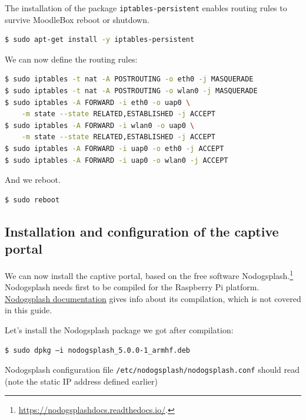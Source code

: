 \documentclass[12pt]{article}
\begin{document}
The installation of the package \lstinline{iptables-persistent} enables routing rules to survive MoodleBox reboot or shutdown.
\begin{lstlisting}[language=bash]
$ sudo apt-get install -y iptables-persistent
\end{lstlisting}

We can now define the routing rules:
\begin{lstlisting}[language=bash]
$ sudo iptables -t nat -A POSTROUTING -o eth0 -j MASQUERADE
$ sudo iptables -t nat -A POSTROUTING -o wlan0 -j MASQUERADE
$ sudo iptables -A FORWARD -i eth0 -o uap0 \
    -m state --state RELATED,ESTABLISHED -j ACCEPT
$ sudo iptables -A FORWARD -i wlan0 -o uap0 \
    -m state --state RELATED,ESTABLISHED -j ACCEPT
$ sudo iptables -A FORWARD -i uap0 -o eth0 -j ACCEPT
$ sudo iptables -A FORWARD -i uap0 -o wlan0 -j ACCEPT
\end{lstlisting}

And we reboot.
\begin{lstlisting}[language=bash]
$ sudo reboot
\end{lstlisting}

\subsection{Installation and configuration of the captive portal}

We can now install the captive portal, based on the free software Nodogsplash.\footnote{\url{https://nodogsplashdocs.readthedocs.io/}.}
Nodogsplash needs first to be compiled for the Raspberry Pi platform.
\href{https://nodogsplashdocs.readthedocs.io/en/stable/compile.html}{Nodogsplash documentation} gives info about its compilation, which is not covered in this guide.

Let's install the Nodogsplash package we got after compilation:
\begin{lstlisting}[language=bash]
$ sudo dpkg –i nodogsplash_5.0.0-1_armhf.deb
\end{lstlisting}
Nodogsplash configuration file \lstinline{/etc/nodogsplash/nodogsplash.conf} should read (note the static IP address defined earlier)

\end{document}
